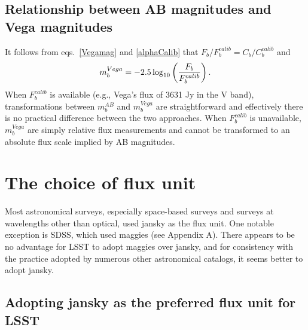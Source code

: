 \documentclass[DM,toc]{lsstdoc}
\begin{document}
\subsection{Relationship between AB magnitudes and Vega magnitudes}

It follows from eqs.~\ref{Vegamag} and \ref{alphaCalib} that
$F_b/F^{calib}_{b} = C_b / C_b^{calib}$ and
\begin{equation}
\label{VegamagAB}
               m^{Vega}_b = -2.5\log_{10}\left({F_b \over F^{calib}_{b}}\right).
\end{equation}
When $F^{calib}_{b}$ is available (e.g., Vega's flux of 3631 Jy in the V band), transformations between
$m^{AB}_b$ and $m^{Vega}_b$ are straightforward and effectively there is no practical difference
between the two approaches. When $F^{calib}_{b}$ is unavailable, $m^{Vega}_b$ are simply relative flux measurements
and cannot be transformed to an absolute flux scale implied by AB magnitudes.


\section{The choice of flux unit}

Most astronomical surveys, especially space-based surveys and surveys
at wavelengths other than optical, used jansky as the flux unit.  One notable
exception is SDSS, which used maggies (see Appendix A). There appears to be
no advantage for LSST to adopt maggies over jansky, and for consistency
with the practice adopted by numerous other astronomical catalogs, it seems
better to adopt jansky.


\subsection{Adopting jansky as the preferred flux unit for LSST  \label{sec:Jy}}
\end{document}
